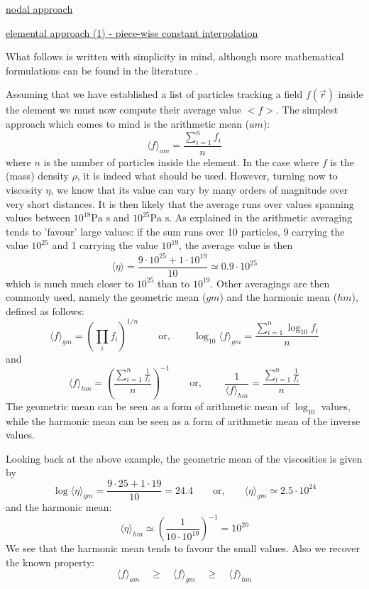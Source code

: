 \underline{nodal approach}

\underline{elemental approach (1) - piece-wise constant interpolation} 

What follows is written with simplicity in mind, although more mathematical formulations 
can be found in the literature \cite{galh18}.

Assuming that we have established a list of particles tracking a field $f(\vec r)$ inside the 
element 
we must now compute their average value $<f>$. 
The simplest approach which comes to mind is the arithmetic mean ($am$):
\[
\langle f\rangle_{am} = \frac{\sum\limits_{i=1}^n f_i}{n}
\]  
where $n$ is the number of particles inside the element.
In the case where $f$ is the (mass) density $\rho$, it is indeed what should be used. 
However, turning now to viscosity $\eta$, we know that its value can vary by many orders of magnitude 
over very short distances.
It is then likely that the average runs over values spanning values between 
$10^{18}\text{Pa s}$ and $10^{25} \text{Pa s}$.
As explained in \cite{scbe08} the arithmetic averaging tends to 'favour' large values: 
if the sum runs over 
10 particles, 9 carrying the value $10^{25}$ and 1 carrying the value $10^{19}$, 
the average value is then
\[
\langle\eta\rangle = \frac{9\cdot 10^{25}+1\cdot 10^{19}}{10} \simeq 0.9\cdot 10^{25}
\]
which is much much closer to $10^{25}$ than to $10^{19}$.
Other averagings are then commonly used, namely the geometric mean ($gm$)  and the 
harmonic mean ($hm$), defined as follows:
\[
\langle f\rangle_{gm} = \left( \prod_i f_i \right)^{1/n} 
\qquad
\text{or, }
\qquad
\log_{10} \langle f \rangle_{gm} = \frac{\sum\limits_{i=1}^{n} \log_{10} f_i }{n}  
\]
and 
\[
\langle f\rangle_{hm} = \left( \frac{\sum\limits_{i=1}^n \frac{1}{f_i} }{n}  \right)^{-1}
\qquad
\text{or, }
\qquad
\frac{1}{\langle f\rangle_{hm} } = \frac{\sum\limits_{i=1}^n  \frac{1}{f_i} }{n}  
\]
The geometric mean can be seen as a form of arithmetic mean of $\log_{10}$ values, 
while the harmonic mean can be seen as 
a form of arithmetic mean of the inverse values.

Looking back at the above example, the geometric mean of the viscosities is given by 
\[
\log \langle \eta\rangle_{gm} = \frac{9\cdot 25+1\cdot 19}{10} = 24.4 
\qquad \text{or,} \qquad 
\langle \eta\rangle_{gm} \simeq 2.5 \cdot 10^{24}
\]
and the harmonic mean:
\[
\langle\eta\rangle_{hm} \simeq \left( \frac{1}{10 \cdot  10^{19}} \right)^{-1} = 10^{20}
\]
We see that the harmonic mean tends to favour the small values. Also we recover the known property:
\begin{equation}
\langle f \rangle_{am}\quad  \geq \quad
\langle f \rangle_{gm}\quad  \geq \quad
\langle f \rangle_{hm} 
\end{equation}

